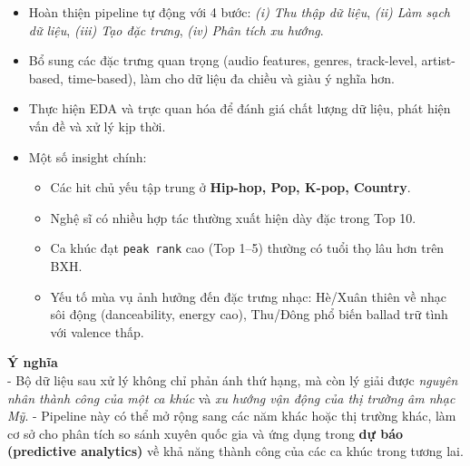     \begin{itemize}
        \item Hoàn thiện pipeline tự động với 4 bước: 
        \textit{(i) Thu thập dữ liệu}, \textit{(ii) Làm sạch dữ liệu}, 
        \textit{(iii) Tạo đặc trưng}, \textit{(iv) Phân tích xu hướng}.
        \item Bổ sung các đặc trưng quan trọng (audio features, genres, track-level, artist-based, time-based), 
        làm cho dữ liệu đa chiều và giàu ý nghĩa hơn.
        \item Thực hiện EDA và trực quan hóa để đánh giá chất lượng dữ liệu, phát hiện vấn đề và xử lý kịp thời.
        \item Một số insight chính: 
        \begin{itemize}
            \item Các hit chủ yếu tập trung ở \textbf{Hip-hop, Pop, K-pop, Country}.  
            \item Nghệ sĩ có nhiều hợp tác thường xuất hiện dày đặc trong Top 10.  
            \item Ca khúc đạt \texttt{peak rank} cao (Top 1–5) thường có tuổi thọ lâu hơn trên BXH.  
            \item Yếu tố mùa vụ ảnh hưởng đến đặc trưng nhạc: Hè/Xuân thiên về nhạc sôi động (danceability, energy cao), 
            Thu/Đông phổ biến ballad trữ tình với valence thấp.  
        \end{itemize}
    \end{itemize}
    
    \textbf{Ý nghĩa} \\
    
    - Bộ dữ liệu sau xử lý không chỉ phản ánh thứ hạng, mà còn lý giải được \textit{nguyên nhân thành công của một ca khúc} và \textit{xu hướng vận động của thị trường âm nhạc Mỹ}.  
    - Pipeline này có thể mở rộng sang các năm khác hoặc thị trường khác, 
    làm cơ sở cho phân tích so sánh xuyên quốc gia và ứng dụng trong \textbf{dự báo (predictive analytics)} về khả năng thành công của các ca khúc trong tương lai.  
